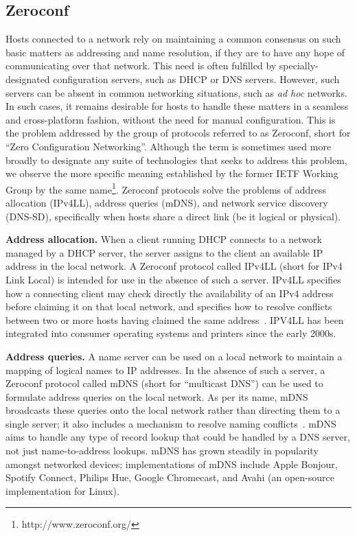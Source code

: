 \subsection{Zeroconf}
\label{sub:background_zeroconf}

Hosts connected to a network rely on maintaining a common consensus on such basic matters as addressing and name resolution, if they are to have any hope of communicating over that network.
This need is often fulfilled by specially-designated configuration servers, such as DHCP or DNS servers.
However, such servers can be absent in common networking situations, such as \textit{ad hoc} networks.
In such cases, it remains desirable for hosts to handle these matters in a seamless and cross-platform fashion, without the need for manual configuration.
This is the problem addressed by the group of protocols referred to as Zeroconf, short for ``Zero Configuration Networking''.
Although the term is sometimes used more broadly to designate any suite of technologies that seeks to address this problem, we observe the more specific meaning established by the former IETF Working Group by the same name\footnote{http://www.zeroconf.org/}.
Zeroconf protocols solve the problems of address allocation (IPv4LL), address queries (mDNS), and network service discovery (DNS-SD), specifically when hosts share a direct link (be it logical or physical).
 
\textbf{Address allocation.}
When a client running DHCP connects to a network managed by a DHCP server, the server assigns to the client an available IP address in the local network.
A Zeroconf protocol called IPv4LL (short for IPv4 Link Local) is intended for use in the absence of such a server.
IPv4LL specifies how a connecting client may check directly the availability of an IPv4 address before claiming it on that local network, and specifies how to resolve conflicts between two or more hosts having claimed the same address~\cite{rfc3927}.
IPV4LL has been integrated into consumer operating systems and printers since the early 2000s.

\textbf{Address queries.}
A name server can be used on a local network to maintain a mapping of logical names to IP addresses.
In the absence of such a server, a Zeroconf protocol called mDNS (short for ``multicast DNS'') can be used to formulate address queries on the local network.
As per its name, mDNS broadcasts these queries onto the local network rather than directing them to a single server; it also includes a mechanism to resolve naming conflicts~\cite{rfc6762}.
mDNS aims to handle any type of record lookup that could be handled by a DNS server, not just name-to-address lookups.
mDNS has grown steadily in popularity amongst networked devices; implementations of mDNS include Apple Bonjour, Spotify Connect, Philips Hue, Google Chromecast, and Avahi (an open-source implementation for Linux).

